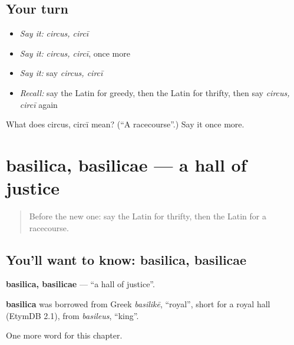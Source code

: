 \subsection*{Your turn}
\begin{itemize}
\raggedright
  \item \emph{Say it:} \emph{circus, circī}
  \item \emph{Say it:} \emph{circus, circī}, once more
  \item \emph{Say it:} say \emph{circus, circī}
  \item \emph{Recall:} say the Latin for greedy, then the Latin for thrifty, then say \emph{circus, circī} again
\end{itemize}

\begin{tcolorbox}[breakable,colback=teal!4,colframe=teal!35!black,title={Before you move on}]
What does circus, circī mean? (\textquotedblleft{}A racecourse\textquotedblright{}.) Say it once more.
\end{tcolorbox}
\section[basilica, basilicae]{basilica, basilicae — a hall of justice}

\label{lesson:LA-C270-basilica}



\begin{quote}
Before the new one: say the Latin for thrifty, then the Latin for a racecourse.
\end{quote}

\subsection*{You'll want to know: basilica, basilicae}
\textbf{basilica, basilicae} — \textquotedblleft{}a hall of justice\textquotedblright{}.

\begin{cousinweb}
\textbf{basilica} was borrowed from Greek \emph{basilikē}, \textquotedblleft{}royal\textquotedblright{}, short for a royal hall (EtymDB 2.1), from \emph{basileus}, \textquotedblleft{}king\textquotedblright{}.
\end{cousinweb}

\begin{grammarlens}[title={What you've built}]
One more word for this chapter.
\end{grammarlens}

